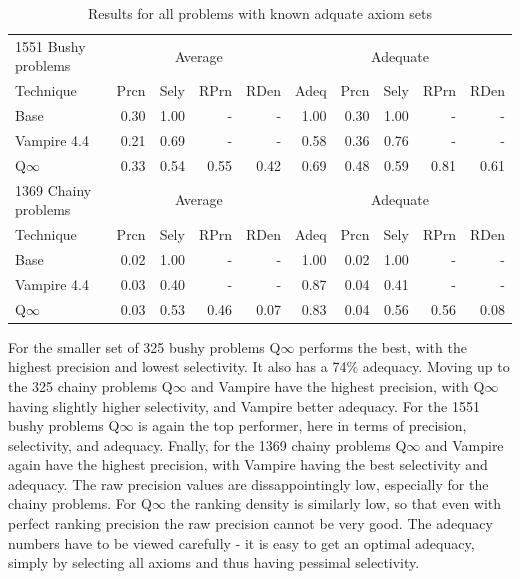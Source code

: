 \documentclass[EPiC]{easychair}
\begin{document}
\begin{table}[hbt]
\begin{center}
\begin{tabular}{|l|rrrr|r|rrrr|}
\hline
1551 Bushy problems  & \multicolumn{4}{|c|}{Average} & \multicolumn{5}{|c|}{Adequate} \\
Technique       & Prcn & Sely & RPrn & RDen & Adeq & Prcn & Sely & RPrn & RDen \\
\hline
Base            & 0.30 & 1.00 &  -   &  -   & 1.00 & 0.30 & 1.00 &  -   &  -   \\
Vampire 4.4     & 0.21 & 0.69 &  -   &  -   & 0.58 & 0.36 & 0.76 &  -   &  -   \\
Q$\infty$       & 0.33 & 0.54 & 0.55 & 0.42 & 0.69 & 0.48 & 0.59 & 0.81 & 0.61 \\
\hline
1369 Chainy problems & \multicolumn{4}{|c|}{Average} & \multicolumn{5}{|c|}{Adequate} \\
Technique       & Prcn & Sely & RPrn & RDen & Adeq & Prcn & Sely & RPrn & RDen \\
\hline
Base            & 0.02 & 1.00 &  -   &  -   & 1.00 & 0.02 & 1.00 &  -   &  -   \\
Vampire 4.4     & 0.03 & 0.40 &  -   &  -   & 0.87 & 0.04 & 0.41 &  -   &  -   \\
Q$\infty$       & 0.03 & 0.53 & 0.46 & 0.07 & 0.83 & 0.04 & 0.56 & 0.56 & 0.08 \\
\hline
\end{tabular}
\caption{Results for all problems with known adquate axiom sets}
\label{Results2078}
\end{center}
\end{table}

For the smaller set of 325 bushy problems Q$\infty$ performs the best, with
the highest precision and lowest selectivity.
It also has a 74\% adequacy.
Moving up to the 325 chainy problems Q$\infty$ and Vampire have the highest
precision, with Q$\infty$ having slightly higher selectivity, and Vampire
better adequacy.
For the 1551 bushy problems Q$\infty$ is again the top performer, here in
terms of precision, selectivity, and adequacy.
Fnally, for the 1369 chainy problems Q$\infty$ and Vampire again have the 
highest precision, with Vampire having the best selectivity and adequacy.
The raw precision values are dissappointingly low, especially for the
chainy problems.
For Q$\infty$ the ranking density is similarly low, so that even with perfect
ranking precision the raw precision cannot be very good.
The adequacy numbers have to be viewed carefully - it is easy to get an
optimal adequacy, simply by selecting all axioms and thus having pessimal
selectivity.
\end{document}
